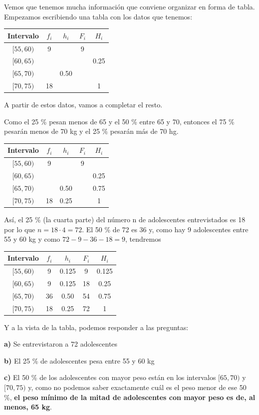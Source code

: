 \documentclass[
]{book}
\begin{document}
Vemos que tenemos mucha información que conviene organizar en forma de tabla. Empezamos escribiendo una tabla con los datos que tenemos:

\begin{longtable}[]{@{}ccccc@{}}
\toprule
Intervalo & \(f_i\) & \(h_i\) & \(F_i\) & \(H_i\)\tabularnewline
\midrule
\endhead
\([55,60)\) & 9 & & 9 &\tabularnewline
\([60,65)\) & & & & 0.25\tabularnewline
\([65,70)\) & & 0.50 & &\tabularnewline
\([70,75)\) & 18 & & & 1\tabularnewline
\bottomrule
\end{longtable}

A partir de estos datos, vamos a completar el resto.

Como el 25 \% pesan menos de 65 y el 50 \% entre 65 y 70, entonces el 75 \% pesarán menos de 70 kg y el 25 \% pesarán más de 70 hg.

\begin{longtable}[]{@{}ccccc@{}}
\toprule
Intervalo & \(f_i\) & \(h_i\) & \(F_i\) & \(H_i\)\tabularnewline
\midrule
\endhead
\([55,60)\) & 9 & & 9 &\tabularnewline
\([60,65)\) & & & & 0.25\tabularnewline
\([65,70)\) & & 0.50 & & 0.75\tabularnewline
\([70,75)\) & 18 & 0.25 & & 1\tabularnewline
\bottomrule
\end{longtable}

Así, el 25 \% (la cuarta parte) del número n de adolescentes entrevistados es 18 por lo que \(n = 18 \cdot 4 = 72\). El 50 \% de 72 es 36 y, como hay 9 adolescentes entre 55 y 60 kg y como \(72 - 9 - 36 - 18 = 9\), tendremos

\begin{longtable}[]{@{}ccccc@{}}
\toprule
Intervalo & \(f_i\) & \(h_i\) & \(F_i\) & \(H_i\)\tabularnewline
\midrule
\endhead
\([55,60)\) & 9 & 0.125 & 9 & 0.125\tabularnewline
\([60,65)\) & 9 & 0.125 & 18 & 0.25\tabularnewline
\([65,70)\) & 36 & 0.50 & 54 & 0.75\tabularnewline
\([70,75)\) & 18 & 0.25 & 72 & 1\tabularnewline
\bottomrule
\end{longtable}

Y a la vista de la tabla, podemos responder a las preguntas:

\textbf{a)} Se entrevistaron a 72 adolescentes

\textbf{b)} El 25 \% de adolescentes pesa entre 55 y 60 kg

\textbf{c)} El 50 \% de los adolescentes con mayor peso están en los intervalos \([65,70)\) y \([70,75)\) y, como no podemos saber exactamente cuál es el peso menor de ese 50 \%, \textbf{el peso mínimo de la mitad de adolescentes con mayor peso es de, al menos, 65 kg}.
\end{document}

